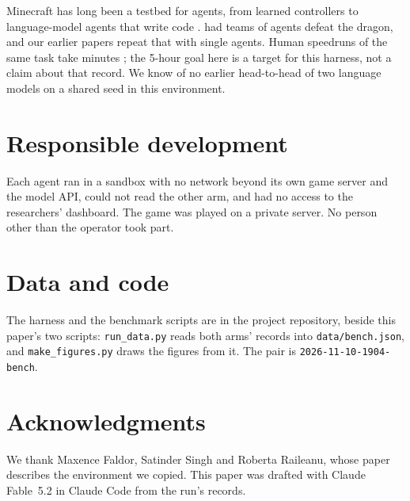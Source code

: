 \documentclass[11pt,a4paper]{article}
\begin{document}
Minecraft has long been a testbed for agents, from learned controllers \citep{baker2022vpt,hafner2025dreamer} to language-model agents that write code \citep{wang2024voyager,zhu2023gitm}. \citet{faldor2026team} had teams of agents defeat the dragon, and our earlier papers repeat that with single agents. Human speedruns of the same task take minutes \citep{speedrun2026}; the 5-hour goal here is a target for this harness, not a claim about that record. We know of no earlier head-to-head of two language models on a shared seed in this environment.

\section{Responsible development}

Each agent ran in a sandbox with no network beyond its own game server and the model API, could not read the other arm, and had no access to the researchers' dashboard. The game was played on a private server. No person other than the operator took part.

\section{Data and code}

The harness and the benchmark scripts are in the project repository, beside this paper's two scripts: \texttt{run\_data.py} reads both arms' records into \texttt{data/bench.json}, and \texttt{make\_figures.py} draws the figures from it. The pair is \texttt{2026-11-10-1904-bench}.

\section*{Acknowledgments}

We thank Maxence Faldor, Satinder Singh and Roberta Raileanu, whose paper describes the environment we copied. This paper was drafted with Claude Fable~5.2 in Claude Code from the run's records.



\end{document}
